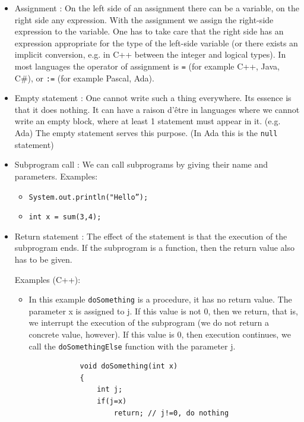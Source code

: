 \documentclass[margin=0px]{article}
\begin{document}
\begin{itemize}
    \item	Assignment : On the left side of an assignment there can be a variable, on the right side any expression. With the
          assignment we assign the right-side expression to the variable. One has to take care that the right side has an
          expression appropriate for the type of the left-side variable (or there exists an implicit conversion, e.g. in C++
          between the integer and logical types). In most languages the operator of assignment is \texttt{=} (for example C++, Java, C\#),
          or \texttt{:=} (for example Pascal, Ada).

    \item	Empty statement : One cannot write such a thing everywhere. Its essence is that it does nothing.
          It can have a raison d'être in languages where we cannot write an empty block,
          where at least 1 statement must appear in it. (e.g. Ada) The empty statement serves this purpose.
          (In Ada this is the \texttt{null} statement)

    \item	Subprogram call : We can call subprograms by giving their name and parameters.
          Examples:
          \begin{itemize}
              \item	\texttt{System.out.println("Hello”);}
              \item	\texttt{int x = sum(3,4);}
          \end{itemize}
    \item	Return statement : The effect of the statement is that the execution of the subprogram ends. If the subprogram is a
          function, then the return value also has to be given.

          \noindent Examples (C++):
          \begin{itemize}
              \item	In this example \texttt{doSomething} is a procedure, it has no return value. The
                    parameter x is assigned to j. If this value is not 0, then we return, that is, we interrupt the
                    execution of the subprogram (we do not return a concrete value, however). If this value is 0, then execution continues,
                    we call the \texttt{doSomethingElse} function with the parameter j.
                    \begin{verbatim}
            void doSomething(int x)
            {
                int j;
                if(j=x)
                    return; // j!=0, do nothing


\end{verbatim}
\end{itemize}
\end{itemize}
\end{document}
